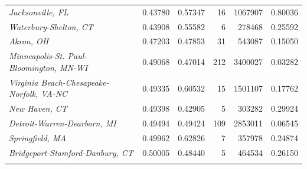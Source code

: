 \begin{table}[!h]
{\begin{tabular}[t]{>{}lrrrrr}
\addlinespace[0.2em]
\hspace{1em}\em{Jacksonville, FL} & 0.43780 & 0.57347 & 16 & 1067907 & 0.80036\\
\addlinespace[0.2em]
\hspace{1em}\em{Waterbury-Shelton, CT} & 0.43908 & 0.55582 & 6 & 278468 & 0.25592\\
\addlinespace[0.2em]
\hspace{1em}\em{Akron, OH} & 0.47203 & 0.47853 & 31 & 543087 & 0.15050\\
\addlinespace[0.2em]
\hspace{1em}\em{Minneapolis-St. Paul-Bloomington, MN-WI} & 0.49068 & 0.47014 & 212 & 3400027 & 0.03282\\
\addlinespace[0.2em]
\hspace{1em}\em{Virginia Beach-Chesapeake-Norfolk, VA-NC} & 0.49335 & 0.60532 & 15 & 1501107 & 0.17762\\
\addlinespace[0.2em]
\hspace{1em}\em{New Haven, CT} & 0.49398 & 0.42905 & 5 & 303282 & 0.29924\\
\addlinespace[0.2em]
\hspace{1em}\em{Detroit-Warren-Dearborn, MI} & 0.49494 & 0.49424 & 109 & 2853011 & 0.06545\\
\addlinespace[0.2em]
\hspace{1em}\em{Springfield, MA} & 0.49962 & 0.62826 & 7 & 357978 & 0.24874\\
\addlinespace[0.2em]
\hspace{1em}\em{Bridgeport-Stamford-Danbury, CT} & 0.50005 & 0.48440 & 5 & 464534 & 0.26150\\
\addlinespace[0.2em]
\bottomrule
\end{tabular}}
\end{table}
